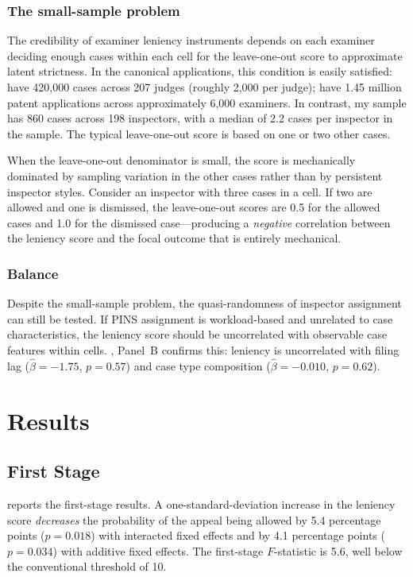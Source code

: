 \documentclass[12pt]{article}
\begin{document}
\subsubsection*{The small-sample problem} The credibility of examiner leniency instruments depends on each examiner deciding enough cases within each cell for the leave-one-out score to approximate latent strictness. In the canonical applications, this condition is easily satisfied: \citet{dobbie2018effects} have 420,000 cases across 207 judges (roughly 2,000 per judge); \citet{sampat2019examiner} have 1.45 million patent applications across approximately 6,000 examiners. In contrast, my sample has 860 cases across 198 inspectors, with a median of 2.2 cases per inspector in the sample. The typical leave-one-out score is based on one or two other cases.

When the leave-one-out denominator is small, the score is mechanically dominated by sampling variation in the other cases rather than by persistent inspector styles. Consider an inspector with three cases in a cell. If two are allowed and one is dismissed, the leave-one-out scores are 0.5 for the allowed cases and 1.0 for the dismissed case---producing a \textit{negative} correlation between the leniency score and the focal outcome that is entirely mechanical.

\subsubsection*{Balance} Despite the small-sample problem, the quasi-randomness of inspector assignment can still be tested. If PINS assignment is workload-based and unrelated to case characteristics, the leniency score should be uncorrelated with observable case features within cells. , Panel~B confirms this: leniency is uncorrelated with filing lag ($\hat{\beta} = -1.75$, $p = 0.57$) and case type composition ($\hat{\beta} = -0.010$, $p = 0.62$).

\section{Results}
\label{sec:results}

\subsection{First Stage}

 reports the first-stage results. A one-standard-deviation increase in the leniency score \textit{decreases} the probability of the appeal being allowed by 5.4 percentage points ($p = 0.018$) with interacted fixed effects and by 4.1 percentage points ($p = 0.034$) with additive fixed effects. The first-stage $F$-statistic is 5.6, well below the conventional threshold of 10.
\end{document}
